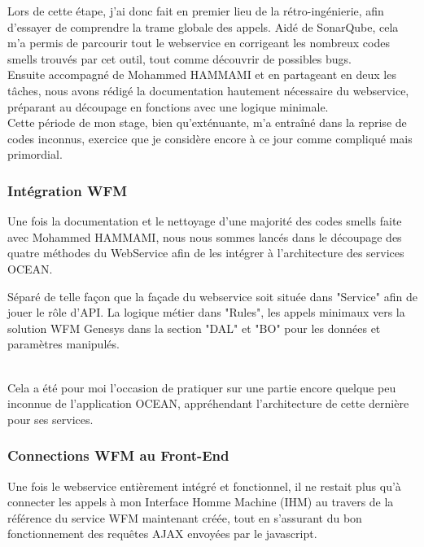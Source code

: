 \documentclass{rapport}
\begin{document}
Lors de cette étape, j'ai donc fait en premier lieu de la rétro-ingénierie, afin d'essayer de comprendre la trame globale des appels. Aidé de SonarQube, cela m'a permis de parcourir tout le webservice en corrigeant les nombreux codes smells trouvés par cet outil, tout comme découvrir de possibles bugs.\\
Ensuite accompagné de Mohammed HAMMAMI et en partageant en deux les tâches, nous avons rédigé la documentation hautement nécessaire du webservice, préparant au découpage en fonctions avec une logique minimale.\\

Cette période de mon stage, bien qu'exténuante, m'a entraîné dans la reprise de codes inconnus, exercice que je considère encore à ce jour comme compliqué mais primordial.

\subsubsection{Intégration WFM}

Une fois la documentation et le nettoyage d'une majorité des codes smells faite avec Mohammed HAMMAMI, nous nous sommes lancés dans le découpage des quatre méthodes du WebService afin de les intégrer à l'architecture des services OCEAN. 

\begin{minipage}{0.35\textwidth}
\end{minipage}
\begin{minipage}{0.55\textwidth}
Séparé de telle façon que la façade du webservice soit située dans "Service" afin de jouer le rôle d'API. La logique métier dans "Rules", les appels minimaux vers la solution WFM Genesys dans la section "DAL" et "BO" pour les données et paramètres manipulés.
\end{minipage}
\vspace{5mm} %
\\

Cela a été pour moi l'occasion de pratiquer sur une partie encore quelque peu inconnue de l'application OCEAN, appréhendant l'architecture de cette dernière pour ses services.

\subsubsection{Connections WFM au Front-End}

Une fois le webservice entièrement intégré et fonctionnel, il ne restait plus qu'à connecter les appels à mon Interface Homme Machine (IHM) au travers de la référence du service WFM maintenant créée, tout en s'assurant du bon fonctionnement des requêtes AJAX envoyées par le javascript.\\
\end{document}
